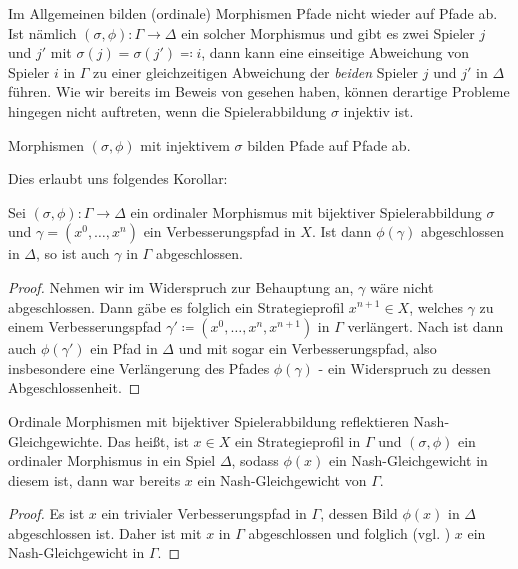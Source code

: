 Im Allgemeinen bilden (ordinale) Morphismen Pfade nicht wieder auf Pfade ab. Ist nämlich $(\sigma, \phi): \Gamma \to \Delta$ ein solcher Morphismus und gibt es zwei Spieler $j$ und $j'$ mit $\sigma(j) = \sigma(j') \eqqcolon i$, dann kann eine einseitige Abweichung von Spieler $i$ in $\Gamma$ zu einer gleichzeitigen Abweichung der \emph{beiden} Spieler $j$ und $j'$ in $\Delta$ führen. Wie wir bereits im Beweis von  gesehen haben, können derartige Probleme hingegen nicht auftreten, wenn die Spielerabbildung $\sigma$ injektiv ist.

\begin{beob}\label{beob:PfadeAufPfade}
	Morphismen $(\sigma, \phi)$ mit injektivem $\sigma$ bilden Pfade auf Pfade ab.
\end{beob}

Dies erlaubt uns folgendes Korollar:

\begin{kor}\label{kor:ReflAbg}
	Sei $(\sigma, \phi): \Gamma \to \Delta$ ein ordinaler Morphismus mit bijektiver Spielerabbildung $\sigma$ und $\gamma = (x^0, \dots, x^n)$ ein Verbesserungspfad in $X$. Ist dann $\phi(\gamma)$ abgeschlossen in $\Delta$, so ist auch $\gamma$ in $\Gamma$ abgeschlossen.
\end{kor}
	
\begin{proof}	
	Nehmen wir im Widerspruch zur Behauptung an, $\gamma$ wäre nicht abgeschlossen. Dann gäbe es folglich ein Strategieprofil $x^{n+1} \in X$, welches $\gamma$ zu einem Verbesserungspfad $\gamma' \coloneqq (x^0, \dots, x^n, x^{n+1})$ in $\Gamma$ verlängert. Nach  ist dann auch $\phi(\gamma')$ ein Pfad in $\Delta$ und mit  sogar ein Verbesserungspfad, also insbesondere eine Verlängerung des Pfades $\phi(\gamma)$ - ein Widerspruch zu dessen Abgeschlossenheit.
\end{proof}

\begin{kor}\label{kor:ReflektNG}
	Ordinale Morphismen mit bijektiver Spielerabbildung reflektieren Nash-Gleichgewichte. Das heißt, ist $x \in X$ ein Strategieprofil in $\Gamma$ und $(\sigma, \phi)$ ein ordinaler Morphismus in ein Spiel $\Delta$, sodass $\phi(x)$ ein Nash-Gleichgewicht in diesem ist, dann war bereits $x$ ein Nash-Gleichgewicht von $\Gamma$.
\end{kor}

\begin{proof}
	Es ist $x$ ein trivialer Verbesserungspfad in $\Gamma$, dessen Bild $\phi(x)$ in $\Delta$ abgeschlossen ist. Daher ist mit  $x$ in $\Gamma$ abgeschlossen und folglich (vgl. ) $x$ ein Nash-Gleichgewicht in $\Gamma$.
\end{proof}

